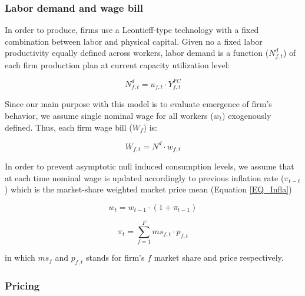\documentclass{SelfArx}
\begin{document}
\subsubsection{Labor demand and wage bill}
\label{sec:org75ce158}

In order to produce, firms use a Leontieff-type technology with a fixed combination between labor and physical capital.
Given no a fixed labor productivity equally defined across workers, labor demand is a function (\(N^{d}_{f,t}\)) of each firm production plan at current capacity utilization level:

\begin{latex}
\begin{equation}
N^{d}_{f,t} = u_{f,t}\cdot Y^{FC}_{f,t}
\end{equation}
\end{latex}

Since our main purpose with this model is to evaluate emergence of firm's behavior, we assume single nominal wage for all workers (\(w_{t}\)) exogenously defined.
Thus, each firm wage bill (\(W_{f}\)) is:
\begin{latex}
\begin{equation}
W_{f,t} = N^{d}\cdot w_{f,t}
\end{equation}
\end{latex}
In order to prevent asymptotic null induced consumption levels, we assume that at each time nominal wage is updated accordingly to previous inflation rate (\(\pi_{t-t}\)) which is the market-share weighted market price mean (Equation \ref{EQ_Infla})

\begin{latex}
\begin{equation}
w_{t} = w_{t-1}\cdot(1+\pi_{t-1})
\end{equation}
\end{latex}
\begin{latex}
\begin{equation}
\label{Ch_super_EQ_Infla}
\pi_{t} = \sum_{f=1}^{F} ms_{f,t}\cdot p_{f,t}
\end{equation}
\end{latex}
in which \(ms_{f}\) and \(p_{f,t}\) stands for firm's \(f\) market share and price respectively.



\subsubsection{Pricing}
\label{sec:org5613668}
\end{document}
